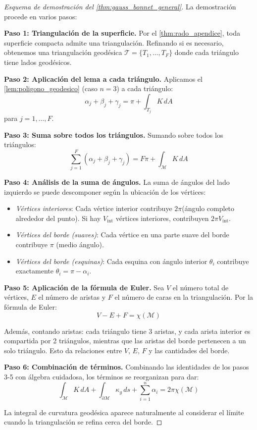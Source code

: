\begin{proof}[Esquema de demostración del \autoref{thm:gauss_bonnet_general}]
La demostración procede en varios pasos:

\textbf{Paso 1: Triangulación de la superficie.}
Por el \autoref{thm:rado_apendice}, toda superficie compacta admite una triangulación. Refinando si es necesario, obtenemos una triangulación geodésica $\mathcal{T} = \{T_1, \ldots, T_F\}$ donde cada triángulo tiene lados geodésicos.

\textbf{Paso 2: Aplicación del lema a cada triángulo.}
Aplicamos el \autoref{lem:poligono_geodesico} (caso $n=3$) a cada triángulo:
\[
\alpha_j + \beta_j + \gamma_j = \pi + \int_{T_j} K \, dA
\]
para $j = 1, \ldots, F$.

\textbf{Paso 3: Suma sobre todos los triángulos.}
Sumando sobre todos los triángulos:
\[
\sum_{j=1}^F (\alpha_j + \beta_j + \gamma_j) = F\pi + \int_{\mathcal{M}} K \, dA
\]

\textbf{Paso 4: Análisis de la suma de ángulos.}
La suma de ángulos del lado izquierdo se puede descomponer según la ubicación de los vértices:
\begin{itemize}
    \item \textit{Vértices interiores}: Cada vértice interior contribuye $2\pi$(ángulo completo alrededor del punto). Si hay $V_{\text{int}}$ vértices interiores, contribuyen $2\pi V_{\text{int}}$.
    \item \textit{Vértices del borde (suaves)}: Cada vértice en una parte suave del borde contribuye $\pi$ (medio ángulo).
    \item \textit{Vértices del borde (esquinas)}: Cada esquina con ángulo interior $\theta_i$ contribuye exactamente $\theta_i = \pi - \alpha_i$.
\end{itemize}

\textbf{Paso 5: Aplicación de la fórmula de Euler.} Sea $V$ el número total de vértices, $E$ el número de aristas y $F$ el número  de caras en la triangulación. Por la fórmula de Euler:
\[
V - E + F = \chi(\mathcal{M})
\]

Además, contando aristas: cada triángulo tiene 3 aristas, y cada arista interior es compartida por 2 triángulos, mientras que las aristas del borde pertenecen a un solo triángulo. Esto da relaciones entre $V$, $E$, $F$ y las cantidades del borde.

\textbf{Paso 6: Combinación de términos.}
Combinando las identidades de los pasos 3-5 con álgebra cuidadosa, los términos se reorganizan para dar:
\[
\int_{\mathcal{M}} K \, dA + \int_{\partial \mathcal{M}} \kappa_g \, ds + \sum_{i=1}^n \alpha_i = 2\pi \chi(\mathcal{M})
\]

La integral de curvatura geodésica aparece naturalmente al considerar el límite cuando la triangulación se refina cerca del borde.
\end{proof}

